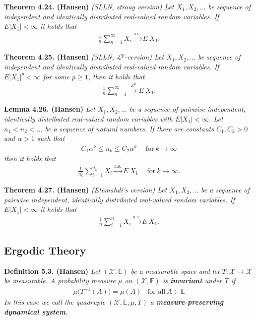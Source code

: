 \documentclass[a4paper,12pt,openany]{book}
\begin{document}
\textbf{Theorem 4.24. (Hansen)} \emph{(SLLN, strong version) Let \(X_1,X_2,...\) be sequence of independent and identically distributed real-valued random variables. If \(E\vert X_1\vert <\infty\) it holds that}
\begin{align*}
    \frac{1}{n}\sum_{n=1}^\infty X_i\stackrel{\text{a.s.}}{\to} E\ X_1.\tag{4.24}
\end{align*}

\textbf{Theorem 4.25. (Hansen)} \emph{(SLLN, \(\mathcal{L}^p\)-version) Let \(X_1,X_2,...\) be sequence of independent and identically distributed real-valued random variables. If \(E\vert X_1\vert^p <\infty\) for some \(p\ge 1\), then it holds that}
\begin{align*}
\frac{1}{n}\sum_{n=1}^\infty \stackrel{\mathcal{L}^p}{\to} E\ X_1.\tag{4.26}    
\end{align*}

\textbf{Lemma 4.26. (Hansen)} \emph{Let \(X_1,X_2,...\) be a sequence of pairwise independent, identically distributed real-valued random variables with \(E\vert X_1\vert <\infty\). Let \(n_1<n_2<...\) be a sequence of natural numbers. If there are constants \(C_1,C_2>0\) and \(\alpha>1\) such that}
\begin{align*}
    C_1\alpha^k\le n_k\le C_2\alpha^k\hspace{15pt}\text{for}\ k\to\infty\tag{4.27}
\end{align*}
\emph{then it holds that}
\begin{align*}
    \frac{1}{n_k}\sum_{i=1}^{n_k}X_i\stackrel{\text{a.s.}}{\to} E\ X_1\hspace{15pt}\text{for}\ k\to \infty.
\end{align*}

\textbf{Theorem 4.27. (Hansen)} \emph{(Etemahdi's version) Let \(X_1,X_2,...\) be a sequence of pairwise independent, identically distributed real-valued random variables. If \(E\vert X_1\vert<\infty\) it holds that}
\begin{align*}
    \frac{1}{n}\sum_{i=1}^nX_i\stackrel{\text{a.s.}}{\to} E\ X_1.\tag{4.30}
\end{align*}

\hypertarget{ergodic-theory}{%
\subsection{Ergodic Theory}\label{ergodic-theory}}

\textbf{Definition 5.3. (Hansen)} \emph{Let \((\mathcal{X},\mathbb{E})\) be a measurable space and let \(T : \mathcal{X}\to \mathcal{X}\) be measurable. A probability measure \(\mu\) on \((\mathcal{X},\mathbb{E})\) is \textbf{invariant} under \(T\) if}
\begin{align*}
    \mu\big(T^{-1}(A)\big)=\mu(A)\hspace{10pt}\text{for all}\ A\in\mathbb{E}\tag{5.5}
\end{align*}
\emph{In this case we call the quadruple \((\mathcal{X},\mathbb{E},\mu,T)\) a \textbf{measure-preserving dynamical system}.}
\end{document}
